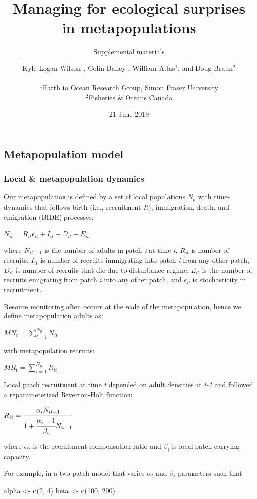 \documentclass[]{article}
\title{Managing for ecological surprises in metapopulations}
\subtitle{Supplemental materials}
\author{Kyle Logan Wilson\(^1\), Colin Bailey\(^1\), William Atlas\(^1\), and
Doug Braun\(^2\)\\
~\\
\(^1\)Earth to Ocean Research Group, Simon Fraser University\\
\(^2\)Fisheries \& Oceans Canada}
\date{21 June 2019}
\newenvironment{Shaded}{\begin{snugshade}}{\end{snugshade}}
\newcommand{\DecValTok}[1]{\textcolor[rgb]{0.00,0.00,0.81}{#1}}
\newcommand{\KeywordTok}[1]{\textcolor[rgb]{0.13,0.29,0.53}{\textbf{#1}}}
\newcommand{\NormalTok}[1]{#1}
\newcommand{\StringTok}[1]{\textcolor[rgb]{0.31,0.60,0.02}{#1}}
\begin{document}
\maketitle

\hypertarget{metapopulation-model}{%
\subsection{Metapopulation model}\label{metapopulation-model}}

\hypertarget{local-metapopulation-dynamics}{%
\subsubsection{Local \& metapopulation
dynamics}\label{local-metapopulation-dynamics}}

Our metapopulation is defined by a set of local populations \(N_p\) with
time-dynamics that follows birth (i.e., recruitment \emph{R}),
immigration, death, and emigration (BIDE) processes:

\(N_{it}= R_{it}\epsilon_{it}+I_{it}-D_{it}-E_{it}\)

where \(N_{it+1}\) is the number of adults in patch \emph{i} at time
\emph{t}, \(R_{it}\) is number of recruits, \(I_{it}\) is number of
recruits immigrating into patch \emph{i} from any other patch,
\(D_{it}\) is number of recruits that die due to disturbance regime,
\(E_{it}\) is the number of recruits emigrating from patch \emph{i} into
any other patch, and \(\epsilon_{it}\) is stochasticity in recruitment.

Resoure monitoring often occurs at the scale of the metapopulation,
hence we define metapopulation adults as:

\({MN}_t = \sum_{i=1}^{N_p} N_{it}\)

with metapopulation recruits:

\(MR_t = \sum_{i=1}^{N_p} R_{it}\)

Local patch recruitment at time \emph{t} depended on adult densities at
\emph{t-1} and followed a reparameterized Beverton-Holt function:

\(R_{it}=\cfrac{\alpha_iN_{it-1}}{1+\cfrac{\alpha_i-1}{\beta_i}N_{it-1}}\)

where \(\alpha_i\) is the recruitment compensation ratio and \(\beta_i\)
is local patch carrying capacity.

For example, in a two patch model that varies \(\alpha_i\) and
\(\beta_i\) parameters such that

\begin{Shaded}
\begin{Highlighting}[]
\NormalTok{alpha <-}\StringTok{ }\KeywordTok{c}\NormalTok{(}\DecValTok{2}\NormalTok{, }\DecValTok{4}\NormalTok{)}
\NormalTok{beta <-}\StringTok{ }\KeywordTok{c}\NormalTok{(}\DecValTok{100}\NormalTok{, }\DecValTok{200}\NormalTok{)}
\end{Highlighting}
\end{Shaded}
\end{document}
